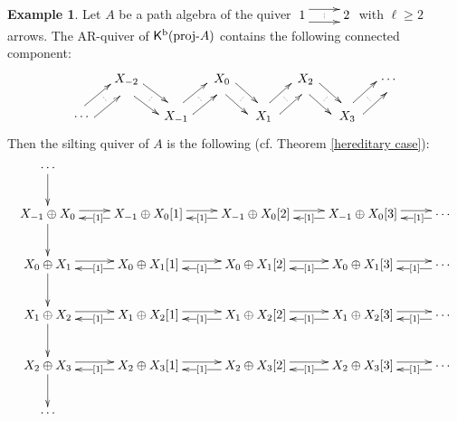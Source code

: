 \documentclass[a4paper,reqno]{amsart}
\theoremstyle{definition}
\newtheorem{example}[theorem]{Example}
\newcommand{\proj}[1]{{\rm{proj}}\text{-}#1} %
\newcommand{\K}{\mathsf{K}}
\begin{document}
\begin{example}
Let $A$ be a path algebra of the quiver 
$\xymatrix{
1\ar@<.5em>[r]^{}="a" & 2 \ar@{<-}@<.5em>[l]^{}="b"  
\ar@{.}"a";"b"
}$ 
with $\ell\ge2$ arrows. 
The AR-quiver of $\K^{\rm b}(\proj{A})$ contains the following connected component:
\[\xymatrix@R.5cm@C.5cm{
& X_{-2}\ar@<-0.7em>[dr]^{}="a1"\ar@<0.5em>[dr]_{}="a2" & & X_{0} \ar@<-0.7em>[dr]^{}="b1"\ar@<0.5em>[dr]_{}="b2" 
& & X_{2} \ar@<-0.7em>[dr]^{}="c1"\ar@<0.5em>[dr]_{}="c2" & &\cdots\\
\cdots\ar@<0.5em>[ur]_{}="g1"\ar@<-0.7em>[ur]^{}="g2" & & X_{-1} \ar@<0.5em>[ur]_{}="d1"\ar@<-0.7em>[ur]^{}="d2" & & X_{1} \ar@<0.5em>[ur]_{}="e1"\ar@<-0.7em>[ur]^{}="e2" & & 
X_3\ar@<0.5em>[ur]_{}="f1"\ar@<-0.7em>[ur]^{}="f2"
\ar@{.}"a1";"a2" \ar@{.}"b1";"b2" \ar@{.}"c1";"c2" \ar@{.}"d1";"d2" \ar@{.}"e1";"e2" \ar@{.}"f1";"f2" \ar@{.}"g1";"g2"
}\]
Then the silting quiver of $A$ is the following (cf. Theorem \ref{hereditary case}):
\[
\xymatrix{
\cdots\ar[d]\\
X_{-1}\oplus X_0\ar[d]\ar@<.3em>[r]&X_{-1}\oplus X_0[1]\ar@<.3em>[r]\ar@<.3em>[l]|{[1]}
&X_{-1}\oplus X_0[2]\ar@<.3em>[r]\ar@<.3em>[l]|{[1]}&X_{-1}\oplus X_0[3]\ar@<.3em>[r]\ar@<.3em>[l]|{[1]}
&\cdots\ar@<.3em>[l]|(0.3){[1]}\\
X_0\oplus X_1\ar[d]\ar@<.3em>[r]&X_0\oplus X_1[1]\ar@<.3em>[r]\ar@<.3em>[l]|{[1]}&X_0\oplus X_1[2]\ar@<.3em>[r]\ar@<.3em>[l]|{[1]}
&X_0\oplus X_1[3]\ar@<.3em>[r]\ar@<.3em>[l]|{[1]}&\cdots\ar@<.3em>[l]|(0.35){[1]}\\
X_1\oplus X_2\ar[d]\ar@<.3em>[r]&X_1\oplus X_2[1]\ar@<.3em>[r]\ar@<.3em>[l]|{[1]}&X_1\oplus X_2[2]\ar@<.3em>[r]\ar@<.3em>[l]|{[1]}
&X_1\oplus X_2[3]\ar@<.3em>[r]\ar@<.3em>[l]|{[1]}&\cdots\ar@<.3em>[l]|(0.35){[1]}\\
X_2\oplus X_3\ar[d]\ar@<.3em>[r]&X_2\oplus X_3[1]\ar@<.3em>[r]\ar@<.3em>[l]|{[1]}&X_2\oplus X_3[2]\ar@<.3em>[r]\ar@<.3em>[l]|{[1]}
&X_2\oplus X_3[3]\ar@<.3em>[r]\ar@<.3em>[l]|{[1]}&\cdots\ar@<.3em>[l]|(0.35){[1]}\\
\cdots\\
}\]
\end{example}
\end{document}
